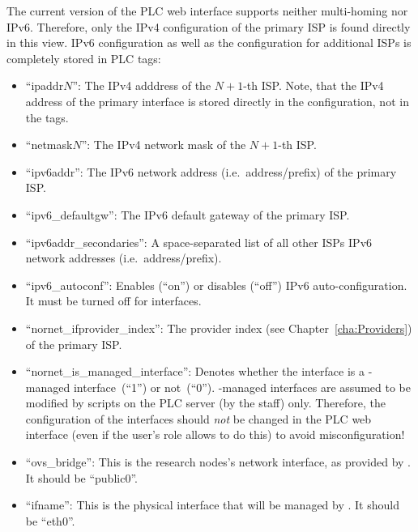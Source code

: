 The current version of the PLC web interface supports neither multi-homing nor IPv6. Therefore, only the IPv4 configuration of the primary ISP is found directly in this view. IPv6 configuration as well as the configuration for additional ISPs is completely stored in PLC tags:
\begin{itemize}
 \item ``ipaddr$N$'': The IPv4 adddress of the $N+1$-th ISP. Note, that the IPv4 address of the primary interface is stored directly in the configuration, not in the tags.
 
 \item ``netmask$N$'': The IPv4 network mask of the $N+1$-th ISP.

 \item ``ipv6addr'': The IPv6 network address (i.e.\ address/prefix) of the primary ISP.
  
 \item ``ipv6\_defaultgw'': The IPv6 default gateway of the primary ISP.

 \item ``ipv6addr\_secondaries'': A space-separated list of all other ISPs IPv6 network addresses (i.e.\ address/prefix).
 
 \item ``ipv6\_autoconf'': Enables (``on'') or disables (``off'') IPv6 auto-configuration. It must be turned off for  interfaces.

 \item ``nornet\_ifprovider\_index'': The provider index (see Chapter~\ref{cha:Providers}) of the primary ISP.

 \item ``nornet\_is\_managed\_interface'': Denotes whether the interface is a -managed interface~(``1'') or not~(``0''). -managed interfaces are assumed to be modified by scripts on the PLC server (by the  staff) only. Therefore, the configuration of the interfaces should \emph{not} be changed in the PLC web interface (even if the user's role allows to do this) to avoid misconfiguration!

 \item ``ovs\_bridge'': This is the research nodes's network interface, as provided by . It should be ``public0''.

 \item ``ifname'': This is the physical interface that will be managed by . It should be ``eth0''.
\end{itemize}

